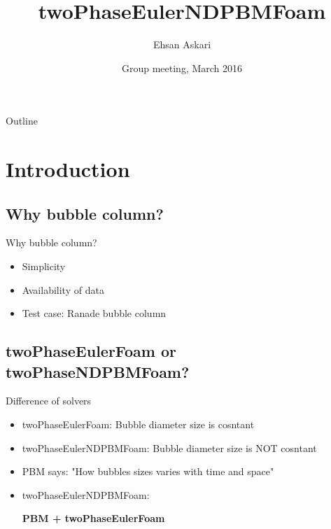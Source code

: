 \documentclass{beamer}
\title{twoPhaseEulerNDPBMFoam}
\author{Ehsan Askari}
\institute[Universities of Sherbrooke] %
{
  
  Department of Chemical Engineering\\
  University of Sherbrooke
}
\date{Group meeting, March 2016}
\begin{document}
\begin{frame}
  \titlepage
\end{frame}

\begin{frame}{Outline}
  \tableofcontents
\end{frame}

\section{Introduction}

\subsection{Why bubble column?}

\begin{frame}{Why bubble column?}
  \begin{itemize}
  \item {
    Simplicity
  }
  \item {
    Availability of data
  }
  
  \item {
    Test case: Ranade bubble column
  }
  
  \end{itemize}
\end{frame}

\subsection{twoPhaseEulerFoam or twoPhaseNDPBMFoam?}

\begin{frame}{Difference of solvers}
  \begin{itemize}
  \item {
    twoPhaseEulerFoam: Bubble diameter size is cosntant
    \pause %
  }
  \item {   
    twoPhaseEulerNDPBMFoam: Bubble diameter size is \alert{NOT} cosntant
  \pause
  }
       
   
  \item {
    PBM says: \alert{"How bubbles sizes varies with time and space"}
    \pause
  }
   
  \item {
    twoPhaseEulerNDPBMFoam: \\ \begin{center}
    \textbf{PBM + twoPhaseEulerFoam}
    \end{center} 
  }

  \end{itemize}
\end{frame}
\end{document}
